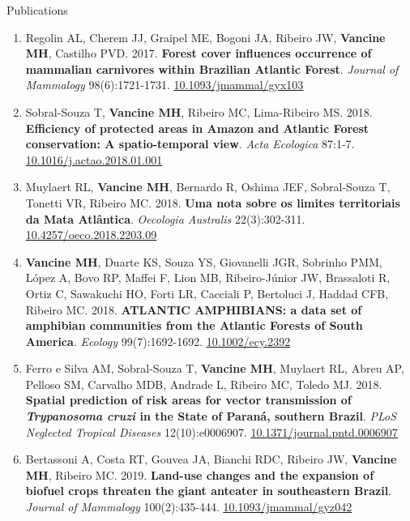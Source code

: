 \documentclass{resume}
\begin{document}
\begin{rSection}{Publications}
\begin{enumerate}
\item Regolin AL, Cherem JJ, Graipel ME, Bogoni JA, Ribeiro JW, {\bf Vancine MH}, Castilho PVD. 2017. {\bf Forest cover influences occurrence of mammalian carnivores within Brazilian Atlantic Forest}. {\it Journal of Mammalogy} 98(6):1721-1731. \href{https://doi.org/10.1093/jmammal/gyx103}{\underline{10.1093/jmammal/gyx103}}

\item Sobral-Souza T, {\bf Vancine MH}, Ribeiro MC, Lima-Ribeiro MS. 2018. {\bf Efficiency of protected areas in Amazon and Atlantic Forest conservation: A spatio-temporal view}. {\it Acta Ecologica} 87:1-7. \href{https://doi.org/10.1016/j.actao.2018.01.001}{\underline{10.1016/j.actao.2018.01.001}}

\item Muylaert RL, {\bf Vancine MH}, Bernardo R, Oshima JEF, Sobral-Souza T, Tonetti VR, Ribeiro MC. 2018. {\bf Uma nota sobre os limites territoriais da Mata Atlântica}. {\it Oecologia Australis} 22(3):302-311. \href{https://doi.org/10.4257/oeco.2018.2203.09}{\underline{10.4257/oeco.2018.2203.09}}

\item {\bf Vancine MH}, Duarte KS, Souza YS, Giovanelli JGR, Sobrinho PMM, López A, Bovo RP, Maffei F, Lion MB, Ribeiro-Júnior JW, Brassaloti R, Ortiz C, Sawakuchi HO, Forti LR, Cacciali P, Bertoluci J, Haddad CFB, Ribeiro MC. 2018. {\bf ATLANTIC AMPHIBIANS: a data set of amphibian communities from the Atlantic Forests of South America}. {\it Ecology} 99(7):1692-1692. \href{https://doi.org/10.1002/ecy.2392}{\underline{10.1002/ecy.2392}}

\item Ferro e Silva AM, Sobral-Souza T, {\bf Vancine MH}, Muylaert RL, Abreu AP, Pelloso SM, Carvalho MDB, Andrade L, Ribeiro MC, Toledo MJ. 2018. {\bf Spatial prediction of risk areas for vector transmission of \textbf{\textit{Trypanosoma cruzi}} in the State of Paraná, southern Brazil}. {\it PLoS Neglected Tropical Diseases} 12(10):e0006907. \href{https://doi.org/10.1371/journal.pntd.0006907}{\underline{10.1371/journal.pntd.0006907}}

\item Bertassoni A, Costa RT, Gouvea JA, Bianchi RDC, Ribeiro JW, {\bf Vancine MH}, Ribeiro MC. 2019. {\bf Land-use changes and the expansion of biofuel crops threaten the giant anteater in southeastern Brazil}. {\it Journal of Mammalogy} 100(2):435-444. \href{https://doi.org/10.1093/jmammal/gyz042}{\underline{10.1093/jmammal/gyz042}}


\end{enumerate}
\end{rSection}
\end{document}
